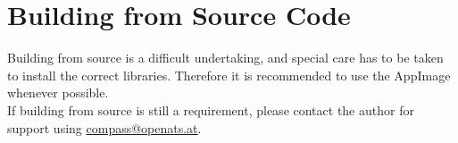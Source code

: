 \section{Building from Source Code}

Building from source is a difficult undertaking, and special care has to be taken to install the correct libraries. Therefore it is recommended to use the AppImage whenever possible. \\

If building from source is still a requirement, please contact the author for support using \href{mailto:compass@openats.at}{compass@openats.at}.


